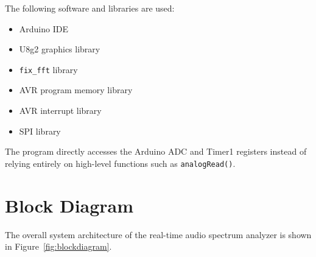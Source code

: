 \documentclass{article}
\begin{document}
\begin{center}
The following software and libraries are used:

\begin{itemize}
    \item Arduino IDE
    \item U8g2 graphics library
    \item \texttt{fix\_fft} library
    \item AVR program memory library
    \item AVR interrupt library
    \item SPI library
\end{itemize}

The program directly accesses the Arduino ADC and Timer1 registers instead of relying entirely on high-level functions such as \texttt{analogRead()}.

\newpage

\section{Block Diagram}

The overall system architecture of the real-time audio spectrum analyzer is shown in Figure~\ref{fig:blockdiagram}.

\begin{figure}[H]
\centering

\end{figure}
\end{center}
\end{document}
